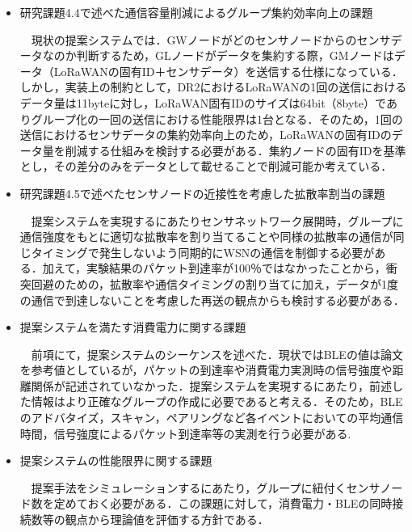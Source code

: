 \begin{itemize}
    \item 研究課題4.4で述べた通信容量削減によるグループ集約効率向上の課題
    \par
    ~~現状の提案システムでは．GWノードがどのセンサノードからのセンサデータなのか判断するため，GLノードがデータを集約する際，GMノードはデータ（LoRaWANの固有ID＋センサデータ）を送信する仕様になっている．しかし，実装上の制約として，DR2におけるLoRaWANの1回の送信におけるデータ量は11byteに対し，LoRaWAN固有IDのサイズは64bit（8byte）でありグループ化の一回の送信における性能限界は1台となる．そのため，1回の送信におけるセンサデータの集約効率向上のため，LoRaWANの固有IDのデータ量を削減する仕組みを検討する必要がある．集約ノードの固有IDを基準とし，その差分のみをデータとして載せることで削減可能か考えている．

    \item 研究課題4.5で述べたセンサノードの近接性を考慮した拡散率割当の課題
    \par
    ~~提案システムを実現するにあたりセンサネットワーク展開時，グループに通信強度をもとに適切な拡散率を割り当てることや同様の拡散率の通信が同じタイミングで発生しないよう同期的にWSNの通信を制御する必要がある．加えて，実験結果のパケット到達率が100％ではなかったことから，衝突回避のための，拡散率や通信タイミングの割り当てに加え，データが1度の通信で到達しないことを考慮した再送の観点からも検討する必要がある．

    \item 提案システムを満たす消費電力に関する課題
    \par
    ~~前項にて，提案システムのシーケンスを述べた．現状ではBLEの値は論文を参考値としているが，パケットの到達率や消費電力実測時の信号強度や距離関係が記述されていなかった．提案システムを実現するにあたり，前述した情報はより正確なグループの作成に必要であると考える．そのため，BLEのアドバタイズ，スキャン，ペアリングなど各イベントにおいての平均通信時間，信号強度によるパケット到達率等の実測を行う必要がある.
    
    \item 提案システムの性能限界に関する課題
    \par
    ~~提案手法をシミュレーションするにあたり，グループに紐付くセンサノード数を定めておく必要がある．この課題に対して，消費電力・BLEの同時接続数等の観点から理論値を評価する方針である．
\end{itemize}
